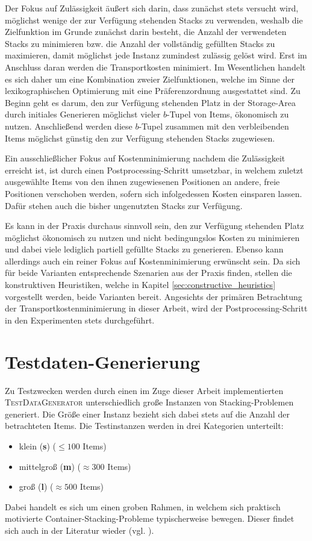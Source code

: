Der Fokus auf Zulässigkeit äußert sich darin, dass zunächst stets versucht wird, möglichst wenige der zur Verfügung stehenden Stacks zu verwenden, weshalb die Zielfunktion im Grunde zunächst darin besteht, die Anzahl der verwendeten Stacks zu minimieren bzw. die Anzahl der vollständig gefüllten Stacks zu maximieren, damit möglichst jede Instanz zumindest zulässig gelöst wird.
Erst im Anschluss daran werden die Transportkosten minimiert.
Im Wesentlichen handelt es sich daher um eine Kombination zweier Zielfunktionen,
welche im Sinne der lexikographischen Optimierung mit eine Präferenzordnung ausgestattet sind.
Zu Beginn geht es darum, den zur Verfügung stehenden Platz in der Storage-Area durch initiales Generieren
möglichst vieler $b$-Tupel von Items, ökonomisch zu nutzen. Anschließend werden diese $b$-Tupel
zusammen mit den verbleibenden Items möglichst günstig den zur Verfügung stehenden Stacks zugewiesen.

Ein ausschließlicher Fokus auf Kostenminimierung nachdem die Zulässigkeit erreicht ist, ist durch
einen Postprocessing-Schritt umsetzbar, in welchem zuletzt ausgewählte Items von den ihnen zugewiesenen Positionen
an andere, freie Positionen verschoben werden, sofern sich infolgedessen Kosten einsparen lassen.
Dafür stehen auch die bisher ungenutzten Stacks zur Verfügung.

\pagebreak

Es kann in der Praxis durchaus sinnvoll sein, den zur Verfügung stehenden Platz möglichst ökonomisch zu nutzen
und nicht bedingungslos Kosten zu minimieren und dabei viele lediglich partiell gefüllte Stacks zu generieren.
Ebenso kann allerdings auch ein reiner Fokus auf Kostenminimierung erwünscht sein. Da sich für beide Varianten
entsprechende Szenarien aus der Praxis finden, stellen die konstruktiven Heuristiken,
welche in Kapitel \ref{sec:constructive_heuristics} vorgestellt werden, beide Varianten bereit.
Angesichts der primären Betrachtung der Transportkostenminimierung in dieser Arbeit,
wird der Postprocessing-Schritt in den Experimenten stets durchgeführt.

\section{Testdaten-Generierung}
\label{sec:test_data}

Zu Testzwecken werden durch einen im Zuge dieser Arbeit implementierten \textsc{TestDataGenerator}
unterschiedlich große Instanzen von Stacking-Problemen generiert. Die Größe einer
Instanz bezieht sich dabei stets auf die Anzahl der betrachteten Items. Die Testinstanzen werden
in drei Kategorien unterteilt:
\begin{itemize}
  \item klein (\textbf{s}) ($\leq 100$ Items)
  \item mittelgroß (\textbf{m}) ($\approx 300$ Items)
  \item groß (\textbf{l}) ($\approx 500$ Items)\newline
\end{itemize}
Dabei handelt es sich um einen groben Rahmen, in welchem sich praktisch motivierte Container-Stacking-Probleme
typischerweise bewegen. Dieser findet sich auch in der Literatur wieder (vgl. \citet{Le2016}).

